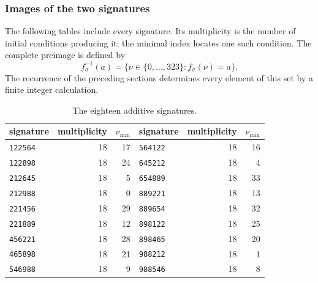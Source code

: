 \par\noindent\begin{minipage}{\linewidth}
\subsubsection{Images of the two signatures}

The following tables include every signature. Its multiplicity is the
number of initial conditions producing it; the minimal index locates one
such condition. The complete preimage is defined by
\[
 f_\sigma^{-1}(a)=\{\nu\in\{0,\ldots,323\}:f_\sigma(\nu)=a\}.
\]
The recurrence of the preceding sections determines every element of
this set by a finite integer calculation.

\begin{table}[H]
\centering\fontsize{9.5}{11.4}\selectfont
\setlength{\abovecaptionskip}{8pt}\setlength{\belowcaptionskip}{6pt}
\renewcommand{\arraystretch}{1.12}
\caption{The eighteen additive signatures.}
\label{act21:tpk:firmas-aditivas}
\begin{tabular}{@{}lrr@{\qquad}lrr@{}}
\toprule
signature&multiplicity&\(\nu_{\min}\)&signature&multiplicity&\(\nu_{\min}\)\\
\midrule
\texttt{122564}&18&17&\texttt{564122}&18&16\\
\texttt{122898}&18&24&\texttt{645212}&18&4\\
\texttt{212645}&18&5&\texttt{654889}&18&33\\
\texttt{212988}&18&0&\texttt{889221}&18&13\\
\texttt{221456}&18&29&\texttt{889654}&18&32\\
\texttt{221889}&18&12&\texttt{898122}&18&25\\
\texttt{456221}&18&28&\texttt{898465}&18&20\\
\texttt{465898}&18&21&\texttt{988212}&18&1\\
\texttt{546988}&18&9&\texttt{988546}&18&8\\
\bottomrule
\end{tabular}

\par\vspace{12pt}


\end{table}
\end{minipage}
